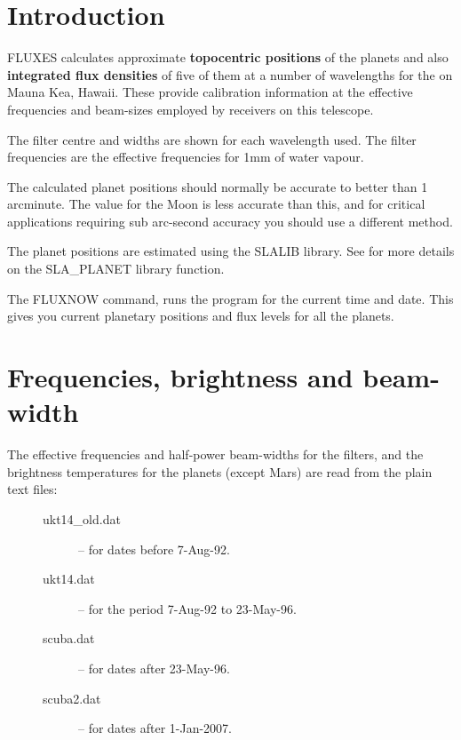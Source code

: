 \documentclass[11pt,twoside]{starlink}
\begin{document}
\scfrontmatter

\section{Introduction}
\label{sec:introduction}

FLUXES calculates approximate \textbf{topocentric positions} of the planets and
also \textbf{integrated flux densities} of five of them at a number of
wavelengths for the
on Mauna Kea, Hawaii.  These provide calibration information at the effective
frequencies and beam-sizes employed by receivers on this telescope.

The filter centre and widths are shown for each wavelength used.  The filter
frequencies are the effective frequencies for 1mm of water vapour.

The calculated planet positions should normally be accurate to better than 1
arcminute. The value for the Moon is less accurate than this, and for critical
applications requiring sub arc-second accuracy you should use a different
method.

The planet positions are estimated using the SLALIB library. See
 for more details on the SLA\_PLANET library function.

The FLUXNOW command, runs the program for the current time and date.  This gives
you current planetary positions and flux levels for all the planets.

\section{Frequencies, brightness and beam-width}
\label{sec:freq}

The effective frequencies and half-power beam-widths for the filters, and the
brightness temperatures for the planets (except Mars) are read from the plain
text files:

\begin{description}
\item[\mbox{}]\mbox{}
\begin{description}
\item [ukt14\_old.dat] -- for dates before 7-Aug-92.
\item [ukt14.dat] -- for the period 7-Aug-92 to 23-May-96.
\item [scuba.dat] -- for dates after 23-May-96.
\item [scuba2.dat] -- for dates after 1-Jan-2007.
\end{description}
\end{description}
\end{document}
